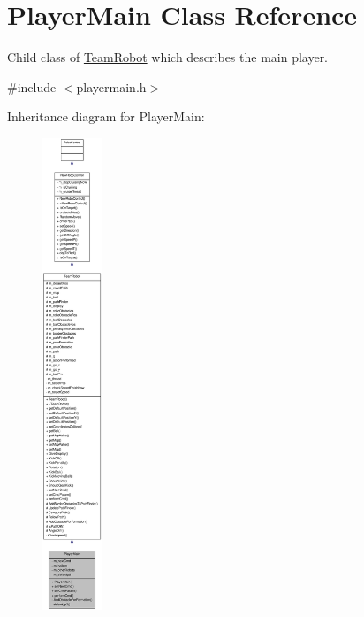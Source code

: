 \hypertarget{classPlayerMain}{
\section{PlayerMain Class Reference}
\label{classPlayerMain}
}


Child class of \hyperlink{classTeamRobot}{TeamRobot} which describes the main player.  




{\ttfamily \#include $<$playermain.h$>$}



Inheritance diagram for PlayerMain:\nopagebreak
\begin{figure}[H]
\begin{center}
\leavevmode
\includegraphics[height=400pt]{classPlayerMain__inherit__graph}
\end{center}
\end{figure}
